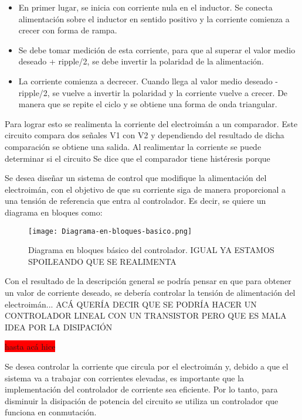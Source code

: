 \begin{itemize}
\item En primer lugar, se inicia con corriente nula en el inductor. Se conecta alimentación sobre el inductor en sentido positivo y la corriente comienza a crecer con forma de rampa.
\item Se debe tomar medición de esta corriente, para que al superar el valor medio deseado + ripple/2, se debe invertir la polaridad de la alimentación.
\item La corriente comienza a decrecer. Cuando llega al valor medio deseado - ripple/2, se vuelve a invertir la polaridad y la corriente vuelve a crecer. De manera que se repite el ciclo y se obtiene una forma de onda triangular.
\end{itemize}

Para lograr esto se realimenta la corriente del electroimán a un comparador. Este circuito compara dos señales V1 con V2 y dependiendo del resultado de dicha comparación se obtiene una salida. Al realimentar la corriente se puede determinar si el circuito 
Se dice que el comparador tiene histéresis porque



Se desea diseñar un sistema de control que modifique la alimentación del electroimán, con el objetivo de que su corriente siga de manera proporcional a una tensión de referencia que entra al controlador. Es decir, se quiere un diagrama en bloques como: 

\begin{figure}[H]
	\centering
	\texttt{[image: Diagrama-en-bloques-basico.png]}
	\caption{Diagrama en bloques básico del controlador. IGUAL YA ESTAMOS SPOILEANDO QUE SE REALIMENTA}
	\label{fig:img_diagrama_bloques_basico}
\end{figure}

Con el resultado de la descripción general se podría pensar en que para obtener un valor de corriente deseado, se debería controlar la tensión de alimentación del electroimán... ACÁ QUERÍA DECIR QUE SE PODRÍA HACER UN CONTROLADOR LINEAL CON UN TRANSISTOR PERO QUE ES MALA IDEA POR LA DISIPACIÓN 

\colorbox{red}{hasta acá hice}

\noindent Se desea controlar la corriente que circula por el electroimán y, debido a que el sistema va a trabajar con corrientes elevadas, es importante que la implementación del controlador de corriente sea eficiente. Por lo tanto, para disminuir la disipación de potencia del circuito se utiliza un controlador que funciona en conmutación.

